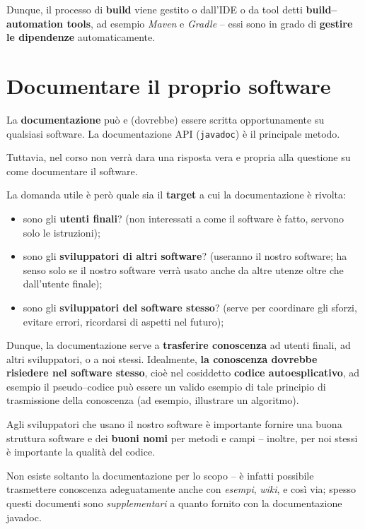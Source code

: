 \documentclass[\fontsizeclass,twocolumn]{\classname}
\theoremstyle{definition}
\theoremstyle{definition}
\begin{document}
Dunque, il processo di \textbf{build} viene gestito o dall'IDE o da tool detti
\textbf{build--automation tools}, ad esempio \emph{Maven} e \emph{Gradle} --
essi sono in grado di \textbf{gestire le dipendenze} automaticamente.

\section{Documentare il proprio software}

La \textbf{documentazione} può e (dovrebbe) essere scritta opportunamente su
qualsiasi software. La documentazione API (\texttt{javadoc}) è il principale
metodo.

Tuttavia, nel corso non verrà dara una risposta vera e propria alla questione
su come documentare il software.

La domanda utile è però quale sia il \textbf{target} a cui la documentazione è
rivolta:
\begin{itemize}
    \item sono gli \textbf{utenti finali}? (non interessati a come il software
        è fatto, servono solo le istruzioni);
    \item sono gli \textbf{sviluppatori di altri software}? (useranno il nostro
        software; ha senso solo se il nostro software verrà usato anche da
        altre utenze oltre che dall'utente finale);
    \item sono gli \textbf{sviluppatori del software stesso}? (serve per
        coordinare gli sforzi, evitare errori, ricordarsi di aspetti nel
        futuro);
\end{itemize}

Dunque, la documentazione serve a \textbf{trasferire conoscenza} ad utenti
finali, ad altri sviluppatori, o a noi stessi. Idealmente, \textbf{la
conoscenza dovrebbe risiedere nel software stesso}, cioè nel cosiddetto
\textbf{codice autoesplicativo}, ad esempio il pseudo--codice può essere un
valido esempio di tale principio di trasmissione della conoscenza (ad esempio,
illustrare un algoritmo).

Agli sviluppatori che usano il nostro software è importante fornire una buona
struttura software e dei \textbf{buoni nomi} per metodi e campi -- inoltre, per
noi stessi è importante la qualità del codice.

Non esiste soltanto la documentazione per lo scopo -- è infatti possibile
trasmettere conoscenza adeguatamente anche con \emph{esempi}, \emph{wiki}, e
così via; spesso questi documenti sono \emph{supplementari} a quanto fornito
con la documentazione javadoc.
\end{document}
